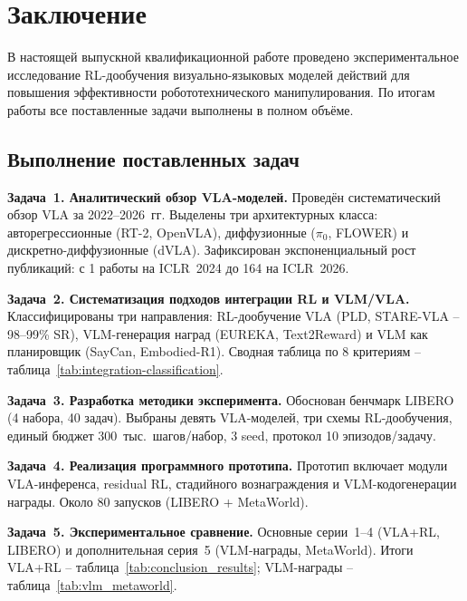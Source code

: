 \chapter*{Заключение}
\label{ch:conclusion}

    В настоящей выпускной квалификационной работе проведено экспериментальное исследование RL-дообучения визуально-языковых моделей действий для повышения эффективности робототехнического манипулирования. По итогам работы все поставленные задачи выполнены в полном объёме.

\section*{Выполнение поставленных задач}

    \textbf{Задача~1. Аналитический обзор VLA-моделей.} Проведён систематический обзор VLA за 2022--2026~гг. Выделены три архитектурных класса: авторегрессионные (RT-2, OpenVLA), диффузионные ($\pi_0$, FLOWER) и дискретно-диффузионные (dVLA). Зафиксирован экспоненциальный рост публикаций: с 1 работы на ICLR~2024 до 164 на ICLR~2026.

    \textbf{Задача~2. Систематизация подходов интеграции RL и VLM/VLA.} Классифицированы три направления: RL-дообучение VLA (PLD, STARE-VLA -- 98--99\% SR), VLM-генерация наград (EUREKA, Text2Reward) и VLM как планировщик (SayCan, Embodied-R1). Сводная таблица по 8 критериям -- таблица~\ref{tab:integration-classification}.

    \textbf{Задача~3. Разработка методики эксперимента.} Обоснован бенчмарк LIBERO (4 набора, 40 задач). Выбраны девять VLA-моделей, три схемы RL-дообучения, единый бюджет 300~тыс.\ шагов/набор, 3 seed, протокол 10 эпизодов/задачу.

    \textbf{Задача~4. Реализация программного прототипа.} Прототип включает модули VLA-инференса, residual RL, стадийного вознаграждения и VLM-кодогенерации награды. Около 80 запусков (LIBERO + MetaWorld).

    \textbf{Задача~5. Экспериментальное сравнение.} Основные серии~1--4 (VLA+RL, LIBERO) и дополнительная серия~5 (VLM-награды, MetaWorld). Итоги VLA+RL -- таблица~\ref{tab:conclusion_results}; VLM-награды -- таблица~\ref{tab:vlm_metaworld}.

